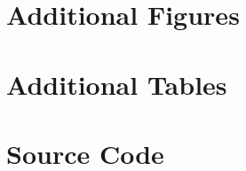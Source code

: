 \documentclass[12pt]{report}
\begin{document}
\chapter{Additional Figures}

\titlespacing*{\chapter}{0pt}{-30pt}{20pt}
\chapter{Additional Tables}

\chapter{Source Code}


\end{document}
